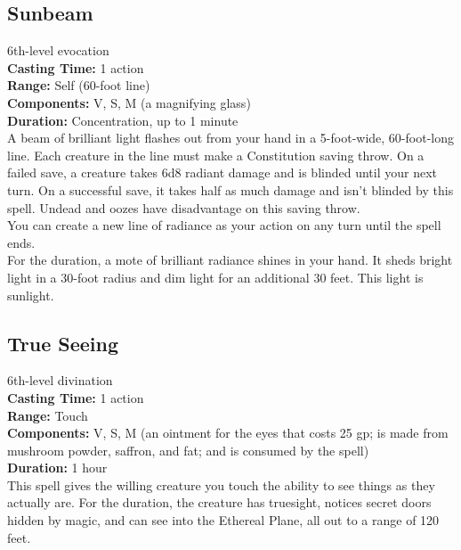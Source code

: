 \documentclass[11pt, A4paper, english]{article}
\begin{document}
		\subsection{Sunbeam}
6th-level evocation \\
\textbf{Casting Time:} 1 action \\
\textbf{Range:} Self (60-foot line) \\
\textbf{Components:} V, S, M (a magnifying glass) \\
\textbf{Duration:} Concentration, up to 1 minute \\
A beam of brilliant light flashes out from your hand in a 5-foot-wide, 60-foot-long line. Each creature in the line must make a Constitution saving throw. On a failed save, a creature takes 6d8 radiant damage and is blinded until your next turn. On a successful save, it takes half as much damage and isn’t blinded by this spell. Undead and oozes have disadvantage on this saving throw. \\
You can create a new line of radiance as your action on any turn until the spell ends. \\
For the duration, a mote of brilliant radiance shines in your hand. It sheds bright light in a 30-foot radius and dim light for an additional 30 feet. This light is sunlight.

		\subsection{True Seeing}
6th-level divination \\
\textbf{Casting Time:} 1 action \\
\textbf{Range:} Touch \\
\textbf{Components:} V, S, M (an ointment for the eyes that costs 25 gp; is made from mushroom powder, saffron, and fat; and is consumed by the spell) \\
\textbf{Duration:} 1 hour \\
This spell gives the willing creature you touch the ability to see things as they actually are. For the duration, the creature has truesight, notices secret doors hidden by magic, and can see into the Ethereal Plane, all out to a range of 120 feet.
\end{document}
